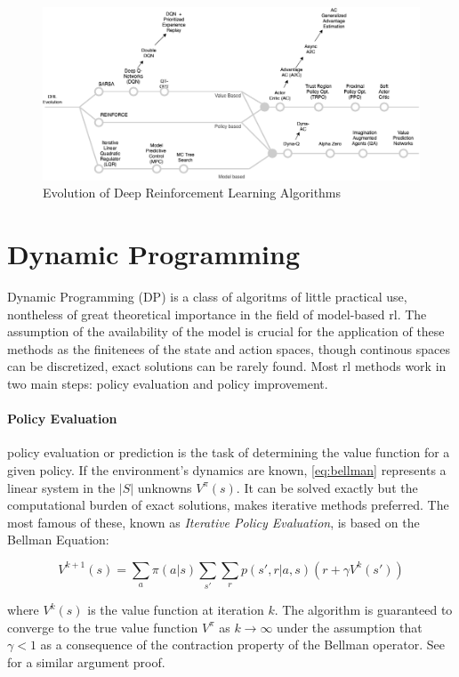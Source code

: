 \begin{figure}
    \centering
    \includegraphics[scale=.35]{images/drl-algorithm-evolution.png}
    \caption{Evolution of Deep Reinforcement Learning Algorithms}
    \label{fig:drl-algorithm-evolution}
\end{figure}

\section{Dynamic Programming}
Dynamic Programming (DP) is a class of algoritms of little practical use, nontheless of great theoretical 
importance in the field of model-based \gls{rl}. The assumption of the availability of the model is 
crucial for the application of these methods as the finitenees of the state and action spaces, though 
continous spaces can be discretized, exact solutions can be rarely found. 
Most \gls{rl} methods work in two main steps: policy evaluation and policy improvement.

\paragraph{Policy Evaluation} policy evaluation or prediction is the task of determining 
the value function for a given policy. If the environment's dynamics are known, \cref{eq:bellman} represents 
a linear system in the $|S|$ unknowns $V^{\pi}(s)$. It can be solved exactly but 
the computational burden of exact solutions, makes iterative methods preferred. 
The most famous of these, known as \textit{Iterative Policy Evaluation}, is based on the Bellman Equation:

$$V^{k+1}(s) = \sum_{a}\pi(a|s)\sum_{s'}\sum_{r}p(s',r|a, s)(r+\gamma V^{k}(s'))$$

where $V^{k}(s)$ is the value function at iteration $k$. The algorithm is guaranteed to converge to the 
true value function $V^{\pi}$ as $k \rightarrow \infty$ under the assumption that $\gamma < 1$ as a 
consequence of the contraction property of the Bellman operator. See  for 
a similar argument proof.

